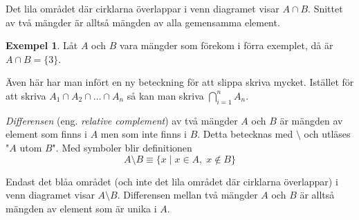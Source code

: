 \documentclass{article}
\theoremstyle{definition}
\newtheorem{exmp}[thm]{Exempel}
\begin{document}
\begin{center}
\end{center}
Det lila området där cirklarna överlappar i venn diagramet visar $A \cap B$. Snittet 
av två mängder är alltså mängden av alla gemensamma element. 
\begin{exmp}
  Låt $A$ och $B$ vara mängder som förekom i förra exemplet, då är $A \cap B = \{3\}$.
\end{exmp}
Även här har man infört en ny beteckning för att slippa skriva mycket. Istället 
för att skriva $A_1 \cap A_2 \cap \ldots \cap A_n$ så kan man skriva $\bigcap\limits_{i = 1}^n A_n$.

\begin{mydef}{}{}
  \textit{Differensen} (eng. \textit{relative complement}) av två mängder $A$ och $B$ är mängden av element som finns i $A$ 
  men som inte finns i $B$. Detta
  betecknas med $\setminus$ och utläses "$A$ utom $B$". Med symboler blir definitionen 
  \[A \setminus B \equiv \{x \; | \; x \in A, \; x \notin B  \}\]
\end{mydef}

\begin{center}
\end{center}
Endast det blåa området (och inte det lila området där cirklarna överlappar) i venn diagramet
visar $A \setminus B$. Differensen mellan två mängder $A$ och $B$ är alltså mängden av element
som är unika i $A$. 
\end{document}
